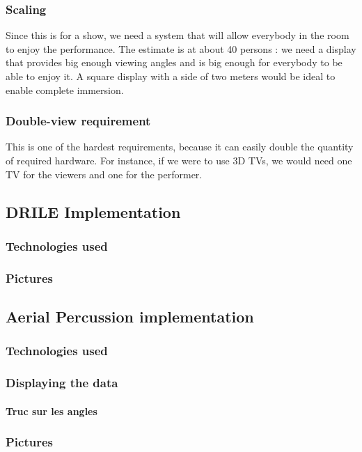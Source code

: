 \subsubsection{Scaling}
Since this is for a show, we need a system that will allow everybody in the room to enjoy the performance. The estimate is at about 40 persons : we need a display that provides big enough viewing angles and is big enough for everybody to be able to enjoy it. A square display with a side of two meters would be ideal to enable complete immersion.
\subsubsection{Double-view requirement}
This is one of the hardest requirements, because it can easily double the quantity of required hardware. For instance, if we were to use 3D TVs, we would need one TV for the viewers and one for the performer.

\subsection{DRILE Implementation}
\subsubsection{Technologies used}
\subsubsection{Pictures}
\subsection{Aerial Percussion implementation}
\subsubsection{Technologies used}
\subsubsection{Displaying the data}
\paragraph{Truc sur les angles}
\subsubsection{Pictures}